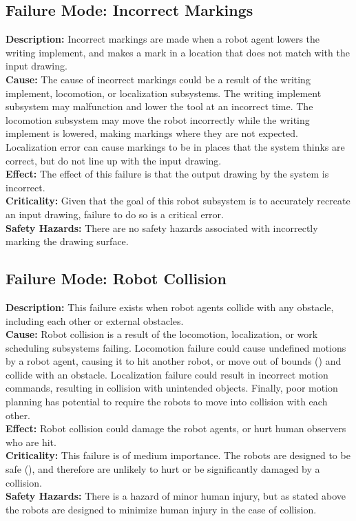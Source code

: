\subsection{Failure Mode: Incorrect Markings}
\label{sec:sys_val_fm_markings}
\textbf{Description:} Incorrect markings are made when a robot agent lowers the writing implement, and makes a mark in a location that does not match with the input drawing. \\
\textbf{Cause:} The cause of incorrect markings could be a result of the writing implement, locomotion, or localization subsystems. The writing implement subsystem may malfunction and lower the tool at an incorrect time. The locomotion subsystem may move the robot incorrectly while the writing implement is lowered, making markings where they are not expected. Localization error can cause markings to be in places that the system thinks are correct, but do not line up with the input drawing.\\
\textbf{Effect:} The effect of this failure is that the output drawing by the system is incorrect.\\
\textbf{Criticality:} Given that the goal of this robot subsystem is to accurately recreate an input drawing, failure to do so is a critical error.\\
\textbf{Safety Hazards:} There are no safety hazards associated with incorrectly marking the drawing surface.

\subsection{Failure Mode: Robot Collision}
\label{sec:sys_val_fm_collision}
\textbf{Description:} This failure exists when robot agents collide with any obstacle, including each other or external obstacles.\\
\textbf{Cause:} Robot collision is a result of the locomotion, localization, or work scheduling subsystems failing. Locomotion failure could cause undefined motions by a robot agent, causing it to hit another robot, or move out of bounds () and collide with an obstacle. Localization failure could result in incorrect motion commands, resulting in collision with unintended objects. Finally, poor motion planning has potential to require the robots to move into collision with each other.\\
\textbf{Effect:} Robot collision could damage the robot agents, or hurt human observers who are hit.\\
\textbf{Criticality:} This failure is of medium importance. The robots are designed to be safe (), and therefore are unlikely to hurt or be significantly damaged by a collision. \\
\textbf{Safety Hazards:} There is a hazard of minor human injury, but as stated above the robots are designed to minimize human injury in the case of collision.

